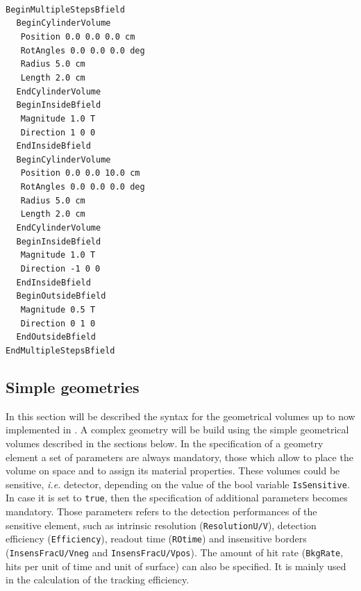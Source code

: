 ~\\
\noindent
{\tt BeginMultipleStepsBfield} \\
$~~~~~${\tt BeginCylinderVolume} \\
$~~~~~~~${\tt Position   0.0 0.0 0.0 cm} \\
$~~~~~~~${\tt RotAngles  0.0 0.0 0.0 deg} \\
$~~~~~~~${\tt Radius     5.0  cm} \\
$~~~~~~~${\tt Length     2.0  cm} \\
$~~~~~${\tt EndCylinderVolume} \\
$~~~~~${\tt BeginInsideBfield} \\
$~~~~~~~${\tt Magnitude    1.0 T} \\
$~~~~~~~${\tt Direction    1 0 0} \\
$~~~~~${\tt EndInsideBfield} \\
$~~~~~${\tt BeginCylinderVolume} \\
$~~~~~~~${\tt Position   0.0 0.0 10.0 cm} \\
$~~~~~~~${\tt RotAngles  0.0 0.0  0.0 deg} \\
$~~~~~~~${\tt Radius     5.0  cm} \\
$~~~~~~~${\tt Length     2.0  cm} \\
$~~~~~${\tt EndCylinderVolume} \\
$~~~~~${\tt BeginInsideBfield} \\
$~~~~~~~${\tt Magnitude    1.0 T} \\
$~~~~~~~${\tt Direction   -1 0 0} \\
$~~~~~${\tt EndInsideBfield} \\
$~~~~~${\tt BeginOutsideBfield} \\
$~~~~~~~${\tt Magnitude    0.5 T} \\
$~~~~~~~${\tt Direction    0 1 0} \\
$~~~~~${\tt EndOutsideBfield} \\
{\tt EndMultipleStepsBfield}

\subsection{Simple geometries}

In this section will be described the syntax for the geometrical volumes up to now implemented in {\guari}. 
A complex geometry will be build using the simple geometrical volumes described in the sections below. In the 
specification of a geometry element a set of parameters are always mandatory, those which allow to place the 
volume on space and to assign its material properties. These volumes could be sensitive, {\it i.e.} detector, 
depending on the value of the bool variable {\tt IsSensitive}. In case it is set to {\tt true}, then the specification 
of additional parameters becomes mandatory. Those parameters refers to the detection performances of the sensitive 
element, such as intrinsic resolution ({\tt ResolutionU/V}), detection efficiency ({\tt Efficiency}), readout time 
({\tt ROtime}) and insensitive borders ({\tt InsensFracU/Vneg} and {\tt InsensFracU/Vpos}). The amount of hit rate 
({\tt BkgRate}, hits per unit of time and unit of surface) can also be specified. It is mainly used in the calculation 
of the tracking efficiency.

